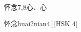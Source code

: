 \begin{entry}{怀念}{7,8}{⼼、⼼}
  \begin{phonetics}{怀念}{huai2nian4}[][HSK 4]
  \end{phonetics}
\end{entry}
